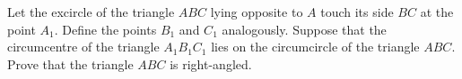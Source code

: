 Let the excircle of the triangle $ABC$ lying opposite to $A$ touch its side $BC$ at the point $A_1$. Define the points $B_1$ and $C_1$ analogously. Suppose that the circumcentre of the triangle $A_1B_1C_1$ lies on the circumcircle of the triangle $ABC$. Prove that the triangle $ABC$ is right-angled.
